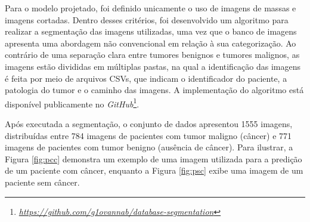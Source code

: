 Para o modelo projetado, foi definido unicamente o uso de imagens de massas e imagens cortadas. Dentro desses critérios, foi desenvolvido um algoritmo para realizar a segmentação das imagens utilizadas, uma vez que o banco de imagens apresenta uma abordagem não convencional em relação à sua categorização. Ao contrário de uma separação clara entre tumores benignos e tumores malignos, as imagens estão divididas em múltiplas pastas, na qual a identificação das imagens é feita por meio de arquivos CSVs, que indicam o identificador do paciente, a patologia do tumor e o caminho das imagens. A implementação do algoritmo está disponível publicamente no \textit{GitHub}\footnote{\href{https://github.com/g1ovannab/database-segmentation}{\textit{https://github.com/g1ovannab/database-segmentation}}}.

Após executada a segmentação, o conjunto de dados apresentou 1555 imagens, distribuídas entre 784 imagens de pacientes com tumor maligno (câncer) e 771 imagens de pacientes com tumor benigno (ausência de câncer). Para ilustrar, a Figura \ref{fig:pcc} demonstra um exemplo de uma imagem utilizada para a predição de um paciente com câncer, enquanto a Figura \ref{fig:psc} exibe uma imagem de um paciente sem câncer. 


